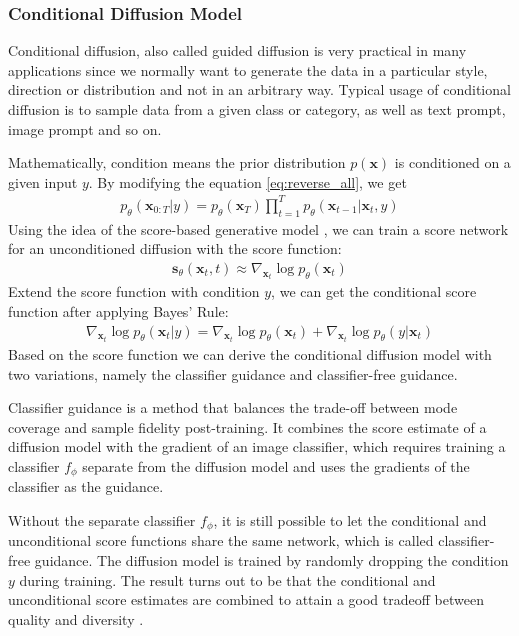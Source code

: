 \documentclass[12pt,DIV14,BCOR12mm,a4paper,footinclude=false,headinclude,parskip=half-,twoside,openright,cleardoublepage=empty,toc=index,bibliography=totoc,listof=totoc]{scrreprt}
\numberwithin{equation}{chapter}
\begin{document}
\subsubsection{Conditional Diffusion Model}\label{sec:cond}
Conditional diffusion, also called guided diffusion is very practical in many applications since we normally want to generate the data in a particular style, direction or distribution and not in an arbitrary way. Typical usage of conditional diffusion is to sample data from a given class or category, as well as text prompt, image prompt and so on.

Mathematically, condition means the prior distribution $p(\mathbf{x})$ is conditioned on a given input $y$. By modifying the equation \ref{eq:reverse_all}, we get
\begin{align}
  p_{\theta}(\mathbf{x}_{0:T}|y) = p_{\theta}(\mathbf{x}_{T})\prod_{t=1}^{T}p_{\theta}(\mathbf{x}_{t-1}|\mathbf{x}_{t},y)
\end{align}
Using the idea of the score-based generative model \cite{song2020generative}, we can train a score network for an unconditioned diffusion with the score function:
\begin{align}
  \mathbf{s}_{\theta}(\mathbf{x}_{t}, t)\approx \nabla _{\mathbf{x}_{t}}\log p_{\theta}(\mathbf{x}_{t})
\end{align}
Extend the score function with condition $y$, we can get the conditional score function after applying Bayes' Rule:
\begin{align}
  \nabla _{\mathbf{x}_{t}}\log p_{\theta}(\mathbf{x}_{t}|y)=\nabla _{\mathbf{x}_{t}}\log p_{\theta}(\mathbf{x}_{t}) + \nabla _{\mathbf{x}_{t}}\log p_{\theta}(y|\mathbf{x}_{t})
\end{align}
Based on the score function we can derive the conditional diffusion model with two variations, namely the classifier guidance and classifier-free guidance.

Classifier guidance is a method that balances the trade-off between mode coverage and sample fidelity post-training. It combines the score estimate of a diffusion model with the gradient of an image classifier, which requires training a classifier $f_{\phi}$ separate from the diffusion model and uses the gradients of the classifier as the guidance.

Without the separate classifier $f_{\phi}$, it is still possible to let the conditional and unconditional score functions share the same network, which is called classifier-free guidance. The diffusion model is trained by randomly dropping the condition $y$ during training. The result turns out to be that the conditional and unconditional score estimates are combined to attain a good tradeoff between quality and diversity \cite{ho2022classifierfree}.
\end{document}
